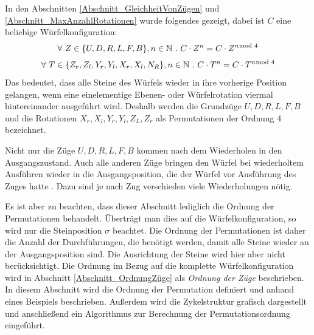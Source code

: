 \documentclass[12pt,a4paper, usenames, dvipsnames]{article}
\theoremstyle{mystyle}
\theoremstyle{definition}
\begin{document}
In den Abschnitten \ref{Abschnitt_GleichheitVonZügen} und \ref{Abschnitt_MaxAnzahlRotationen} wurde folgendes gezeigt, dabei ist $C$ eine beliebige Würfelkonfiguration:
\begin{align*}
\forall \ Z \in \{ U, D, R, L, F, B \}, n \in \mathbb{N} \ . \ C \cdot Z^n=C \cdot Z^{n \hspace*{-0.5em} \mod 4} 
\end{align*}
\vspace*{-3em}
\begin{align*}
\forall \ T \in \{{Z_r}, {Z_l}, {Y_r}, {Y_l}, {X_r}, {X_l}, N_R \}, n \in \mathbb{N} \ . \ C \cdot T^n=C \cdot T^{n \hspace*{-0.5em} \mod 4}
\end{align*}
Das bedeutet, dass alle Steine des Würfels wieder in ihre vorherige Position gelangen, wenn eine einelementige Ebenen- oder Würfelrotation viermal hintereinander ausgeführt wird. Deshalb werden die Grundzüge $U, D, R, L, F, B$ und die Rotationen $X_r, X_l, Y_r, Y_l, Z_L, Z_r$ als Permutationen der Ordnung 4 bezeichnet. 


Nicht nur die Züge $U, D, R, L, F, B$ kommen nach dem Wiederholen in den Ausgangszustand. Auch alle anderen Züge bringen den Würfel bei wiederholtem Ausführen wieder in die Ausgangsposition, die der Würfel vor Ausführung des Zuges hatte \cite{TD}. Dazu sind je nach Zug verschieden viele Wiederholungen nötig. 


Es ist aber zu beachten, dass dieser Abschnitt lediglich die Ordnung der Permutationen behandelt. Überträgt man dies auf die Würfelkonfiguration, so wird nur die Steinposition $\sigma$ beachtet. Die Ordnung der Permutationen ist daher die Anzahl der Durchführungen, die benötigt werden, damit alle Steine wieder an der Ausgangsposition sind. Die Ausrichtung der Steine wird hier aber nicht berücksichtigt. Die Ordnung im Bezug auf die komplette Würfelkonfiguration wird in Abschnitt \ref{Abschnitt_OrdnungZüge} als \textit{Ordnung der Züge} beschrieben. In diesem Abschnitt wird die Ordnung der Permutation definiert und anhand eines Beispiels beschrieben. Außerdem wird die Zykelstruktur grafisch dargestellt und anschließend ein Algorithmus zur Berechnung der Permutationsordnung eingeführt.


\end{document}
